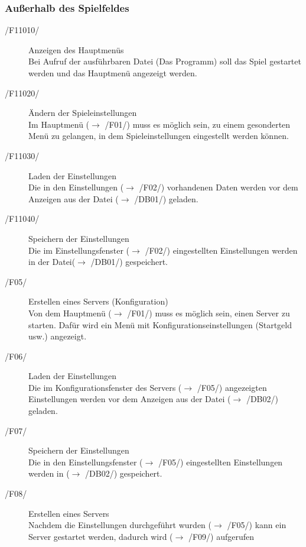 \documentclass[a4paper,10pt]{article}
\begin{document}
\subsubsection{Außerhalb des Spielfeldes}
\begin{description}
\item[/F11010/] Anzeigen des Hauptmenüs \\
Bei Aufruf der ausführbaren Datei (Das Programm) soll das Spiel gestartet werden und das Hauptmenü angezeigt werden.

\item[/F11020/] Ändern der Spieleinstellungen \\
Im Hauptmenü ($\rightarrow$ /F01/) muss es möglich sein, zu einem gesonderten Menü zu gelangen, in dem Spieleinstellungen eingestellt werden können.

\item[/F11030/] Laden der Einstellungen \\
Die in den Einstellungen ($\rightarrow$ /F02/) vorhandenen Daten werden vor dem Anzeigen aus der Datei ($\rightarrow$ /DB01/) geladen.

\item[/F11040/] Speichern der Einstellungen \\
Die im Einstellungsfenster ($\rightarrow$ /F02/) eingestellten Einstellungen werden in der Datei($\rightarrow$ /DB01/) gespeichert.

\item[/F05/] Erstellen eines Servers (Konfiguration) \\
Von dem Hauptmenü ($\rightarrow$ /F01/) muss es möglich sein, einen Server zu starten. Dafür wird ein Menü mit Konfigurationseinstellungen (Startgeld usw.) angezeigt.

\item[/F06/] Laden der Einstellungen \\
Die im Konfigurationsfenster des Servers ($\rightarrow$ /F05/) angezeigten Einstellungen werden vor dem Anzeigen aus der Datei ($\rightarrow$ /DB02/) geladen.

\item[/F07/] Speichern der Einstellungen \\
Die in den Einstellungsfenster ($\rightarrow$ /F05/) eingestellten Einstellungen werden in ($\rightarrow$ /DB02/) gespeichert.

\item[/F08/] Erstellen eines Servers \\
Nachdem die Einstellungen durchgeführt wurden ($\rightarrow$ /F05/) kann ein Server gestartet werden, dadurch wird ($\rightarrow$ /F09/) aufgerufen


\end{description}
\end{document}
